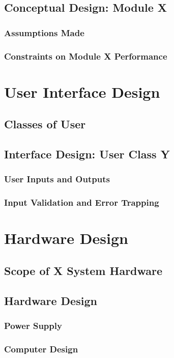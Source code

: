 \documentclass[10pt,a4paper]{report}
\begin{document}
\section{Conceptual Design: Module X}
\subsection{Assumptions Made}
\subsection{Constraints on Module X Performance}

\chapter{User Interface Design}
\section{Classes of User}
\section{Interface Design: User Class Y}
\subsection{User Inputs and Outputs}
\subsection{Input Validation and Error Trapping}

\chapter{Hardware Design}
\section{Scope of X System Hardware}

\section{Hardware Design}
\subsection{Power Supply}
\subsection{Computer Design}
\end{document}
